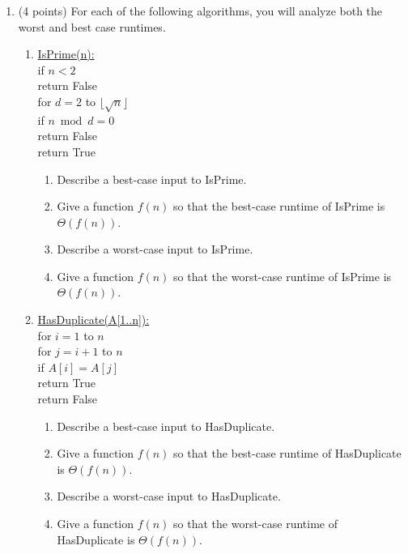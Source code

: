 \documentclass[11pt]{article}
\begin{document}
\begin{enumerate}
\item (4 points) For each of the following algorithms, you will analyze both the worst and best case runtimes.
\begin{enumerate}
    \item
    \begin{algo}
        \underline{IsPrime(n):}\\
        \> if $n < 2$\\
        \> \> return False\\
        \> for $d = 2$ to $\lfloor \sqrt{n} \rfloor$\\
        \> \> if $n \bmod d = 0$\\
        \> \> \> return False\\
        \> return True
    \end{algo}
    \begin{enumerate}
        \item Describe a best-case input to IsPrime.
        \item Give a function $f(n)$ so that the best-case runtime of IsPrime is $\Theta(f(n))$.
        \item Describe a worst-case input to IsPrime.
        \item Give a function $f(n)$ so that the worst-case runtime of IsPrime is $\Theta(f(n))$.
    \end{enumerate}
    \item 
    \begin{algo}
        \underline{HasDuplicate(A[1..n]):}\\
        \> for $i = 1$ to $n$\\
        \> \> for $j = i+1$ to $n$\\
        \> \> \> if $A[i] = A[j]$\\
        \> \> \> \> return True\\
        \> return False
    \end{algo}
    \begin{enumerate}
        \item Describe a best-case input to HasDuplicate.
        \item Give a function $f(n)$ so that the best-case runtime of HasDuplicate is $\Theta(f(n))$.
        \item Describe a worst-case input to HasDuplicate.
        \item Give a function $f(n)$ so that the worst-case runtime of HasDuplicate is $\Theta(f(n))$.
    \end{enumerate}
\end{enumerate}



\end{enumerate}
\end{document}
